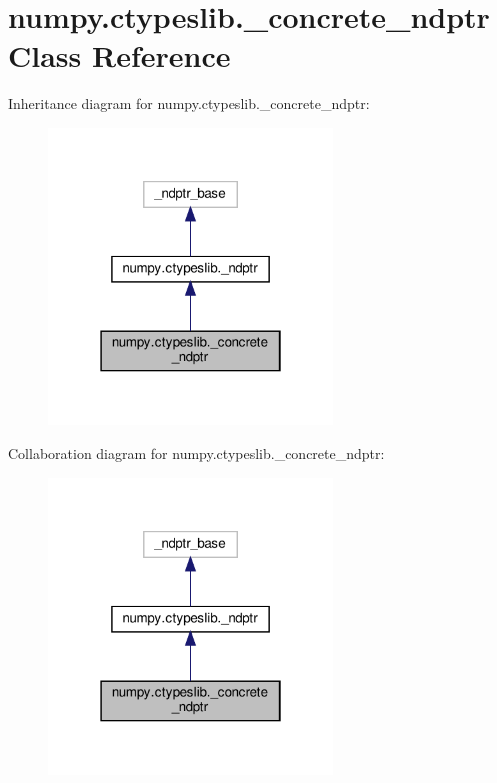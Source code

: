 \hypertarget{classnumpy_1_1ctypeslib_1_1__concrete__ndptr}{}\section{numpy.\+ctypeslib.\+\_\+concrete\+\_\+ndptr Class Reference}
\label{classnumpy_1_1ctypeslib_1_1__concrete__ndptr}


Inheritance diagram for numpy.\+ctypeslib.\+\_\+concrete\+\_\+ndptr\+:
\nopagebreak
\begin{figure}[H]
\begin{center}
\leavevmode
\includegraphics[width=214pt]{classnumpy_1_1ctypeslib_1_1__concrete__ndptr__inherit__graph}
\end{center}
\end{figure}


Collaboration diagram for numpy.\+ctypeslib.\+\_\+concrete\+\_\+ndptr\+:
\nopagebreak
\begin{figure}[H]
\begin{center}
\leavevmode
\includegraphics[width=214pt]{classnumpy_1_1ctypeslib_1_1__concrete__ndptr__coll__graph}
\end{center}
\end{figure}
